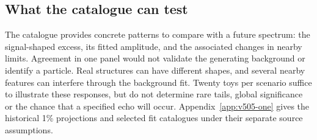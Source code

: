 \subsection{What the catalogue can test}
The catalogue provides concrete patterns to compare with a future spectrum:
the signal-shaped excess, its fitted amplitude, and the associated changes
in nearby limits. Agreement in one panel would not validate the generating
background or identify a particle. Real structures can have different
shapes, and several nearby features can interfere through the background
fit. Twenty toys per scenario suffice to illustrate these responses, but do
not determine rare tails, global significance or the chance that a specified
echo will occur. Appendix~\ref{app:v505-one} gives the historical 1\%
projections and selected fit catalogues under their separate source assumptions.

